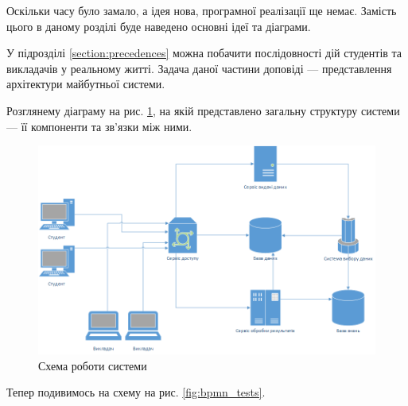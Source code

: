 




Оскільки часу було замало, а ідея нова, програмної реалізації ще немає.
Замість цього в даному розділі буде наведено основні ідеї та діаграми.

У підрозділі \ref{section:precedences} можна побачити послідовності дій
студентів та викладачів у реальному житті.
Задача даної частини доповіді --- представлення архітектури майбутньої системи.

Розглянему діаграму на рис. \ref{fig:scheme_main}, на якій представлено загальну
структуру системи --- її компоненти та зв’язки між ними.

\begin{figure}[htbp]
    \center\includegraphics[width=\textwidth]{images/scheme_main.png}
    \caption{Схема роботи системи}
    \label{fig:scheme_main}
\end{figure}

Тепер подивимось на схему на рис. \ref{fig:bpmn_tests}.

